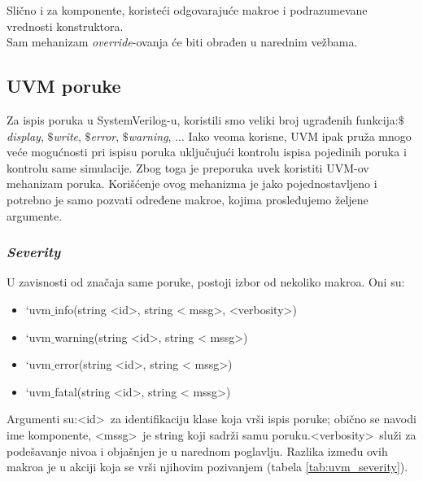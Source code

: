 Slično i za komponente, koristeći odgovarajuće makroe i podrazumevane vrednosti
konstruktora.\\

Sam mehanizam \emph{override}-ovanja će biti obrađen u narednim vežbama.


\subsection{UVM poruke}

Za ispis poruka u SystemVerilog-u, koristili smo veliki broj ugrađenih
funkcija:\emph{\(\$\)display}, \emph{\(\$\)write}, \emph{\(\$\)error},
\emph{\(\$\)warning}, ... Iako veoma korisne, UVM ipak pruža mnogo veće
mogućnosti pri ispisu poruka uključujući kontrolu ispisa pojedinih poruka i
kontrolu same simulacije. Zbog toga je preporuka uvek koristiti UVM-ov mehanizam
poruka. Korišćenje ovog mehanizma je jako pojednostavljeno i potrebno je samo
pozvati određene makroe, kojima prosleđujemo željene argumente.

\subsubsection{\emph{Severity}}

U zavisnosti od značaja same poruke, postoji izbor od nekoliko makroa. Oni su:

\begin{itemize}
\item `uvm\(\_\)info(string \textless id\textgreater , string \textless
  mssg\textgreater , \textless verbosity\textgreater )
\item `uvm\(\_\)warning(string \textless id\textgreater , string \textless
  mssg\textgreater )
\item `uvm\(\_\)error(string \textless id\textgreater , string \textless
  mssg\textgreater )
\item `uvm\(\_\)fatal(string \textless id\textgreater , string \textless
  mssg\textgreater )
\end{itemize}

Argumenti su:\textless id\textgreater\ za identifikaciju klase koja vrši ispis
poruke; obično se navodi ime komponente, \textless mssg\textgreater\ je string
koji sadrži samu poruku.\textless verbosity\textgreater\ služi za podešavanje
nivoa i objašnjen je u narednom poglavlju. Razlika između ovih makroa je u
akciji koja se vrši njihovim pozivanjem (tabela \ref{tab:uvm_severity}).\\

